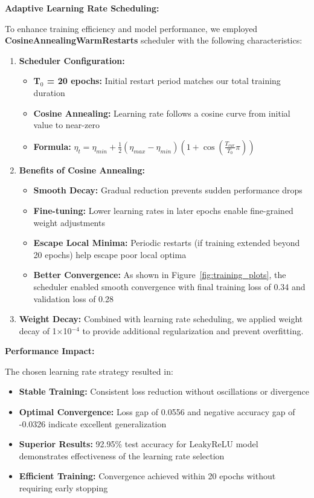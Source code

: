 \documentclass[12pt,a4paper]{article}
\begin{document}
\textbf{Adaptive Learning Rate Scheduling:}

To enhance training efficiency and model performance, we employed \textbf{CosineAnnealingWarmRestarts} scheduler with the following characteristics:

\begin{enumerate}
    \item \textbf{Scheduler Configuration:}
    \begin{itemize}
        \item \textbf{T$_0$ = 20 epochs:} Initial restart period matches our total training duration
        \item \textbf{Cosine Annealing:} Learning rate follows a cosine curve from initial value to near-zero
        \item \textbf{Formula:} $\eta_t = \eta_{min} + \frac{1}{2}(\eta_{max} - \eta_{min})(1 + \cos(\frac{T_{cur}}{T_0}\pi))$
    \end{itemize}
    
    \item \textbf{Benefits of Cosine Annealing:}
    \begin{itemize}
        \item \textbf{Smooth Decay:} Gradual reduction prevents sudden performance drops
        \item \textbf{Fine-tuning:} Lower learning rates in later epochs enable fine-grained weight adjustments
        \item \textbf{Escape Local Minima:} Periodic restarts (if training extended beyond 20 epochs) help escape poor local optima
        \item \textbf{Better Convergence:} As shown in Figure~\ref{fig:training_plots}, the scheduler enabled smooth convergence with final training loss of 0.34 and validation loss of 0.28
    \end{itemize}
    
    \item \textbf{Weight Decay:} Combined with learning rate scheduling, we applied weight decay of 1×10$^{-4}$ to provide additional regularization and prevent overfitting.
\end{enumerate}

\textbf{Performance Impact:}

The chosen learning rate strategy resulted in:
\begin{itemize}
    \item \textbf{Stable Training:} Consistent loss reduction without oscillations or divergence
    \item \textbf{Optimal Convergence:} Loss gap of 0.0556 and negative accuracy gap of -0.0326 indicate excellent generalization
    \item \textbf{Superior Results:} 92.95\% test accuracy for LeakyReLU model demonstrates effectiveness of the learning rate selection
    \item \textbf{Efficient Training:} Convergence achieved within 20 epochs without requiring early stopping
\end{itemize}
\end{document}
